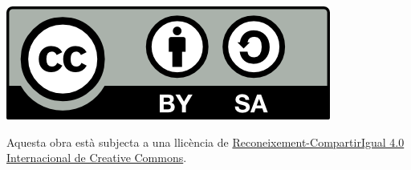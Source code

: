 \thispagestyle{empty}

\vspace*{\fill}

\begin{center}
\includegraphics[scale=1]{./assets/cc-by-sa.png}

{\small Aquesta obra està subjecta a una llicència de \href{http://creativecommons.org/licenses/by-sa/4.0/deed.ca}{Reconeixement-CompartirIgual 4.0 Internacional de Creative Commons}.}
\end{center}\\

\newpage

